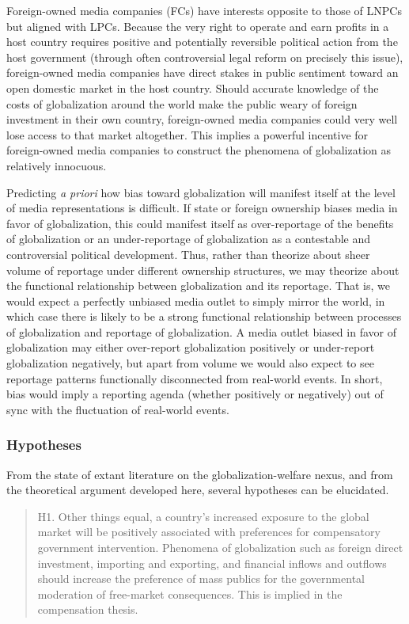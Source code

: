 \documentclass[a4paper]{article}
\begin{document}
Foreign-owned media companies (FCs) have interests opposite to those of LNPCs but aligned with LPCs. Because the very right to operate and earn profits in a host country requires positive and potentially reversible political action from the host government (through often controversial legal reform on precisely this issue), foreign-owned media companies have direct stakes in public sentiment toward an open domestic market in the host country. Should accurate knowledge of the costs of globalization around the world make the public weary of foreign investment in their own country, foreign-owned media companies could very well lose access to that market altogether. This implies a powerful incentive for foreign-owned media companies to construct the phenomena of globalization as relatively innocuous. 

Predicting \emph{a priori} how bias toward globalization will manifest itself at the level of media representations is difficult. If state or foreign ownership biases media in favor of globalization, this could manifest itself as over-reportage of the benefits of globalization or an under-reportage of globalization as a contestable and controversial political development. Thus, rather than theorize about sheer volume of reportage under different ownership structures, we may theorize about the functional relationship between globalization and its reportage. That is, we would expect a perfectly unbiased media outlet to simply mirror the world, in which case there is likely to be a strong functional relationship between processes of globalization and reportage of globalization. A media outlet biased in favor of globalization may either over-report globalization positively or under-report globalization negatively, but apart from volume we would also expect to see reportage patterns functionally disconnected from real-world events. In short, bias would imply a reporting agenda (whether positively or negatively) out of sync with the fluctuation of real-world events.

\subsubsection{Hypotheses}
From the state of extant literature on the globalization-welfare nexus, and from the theoretical argument developed here, several hypotheses can be elucidated.

\singlespacing
\begin{quote}
H1. Other things equal, a country's increased exposure to the global market will be positively associated with preferences for compensatory government intervention. Phenomena of globalization such as foreign direct investment, importing and exporting, and financial inflows and outflows should increase the preference of mass publics for the governmental moderation of free-market consequences. This is implied in the compensation thesis.
\end{quote}
\doublespacing
\end{document}
